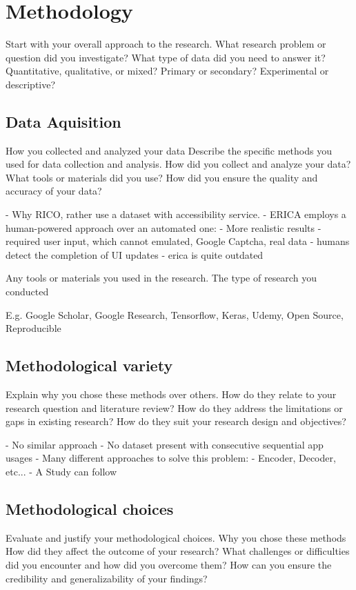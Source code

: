 \chapter{Methodology}

Start with your overall approach to the research.
What research problem or question did you investigate?
What type of data did you need to answer it?
Quantitative, qualitative, or mixed? Primary or secondary? Experimental or descriptive?

\section{Data Aquisition}
How you collected and analyzed your data
Describe the specific methods you used for data collection and analysis.
How did you collect and analyze your data?
What tools or materials did you use?
How did you ensure the quality and accuracy of your data?

- Why RICO, rather use a dataset with accessibility service.
- ERICA employs a human-powered approach over an automated one:
    - More realistic results
    - required user input, which cannot emulated, Google Captcha, real data
    - humans detect the completion of UI updates \cite{deka2016erica}
    - erica is quite outdated


Any tools or materials you used in the research.
The type of research you conducted

E.g. Google Scholar, Google Research, Tensorflow, Keras, Udemy, Open Source, Reproducible

\section{Methodological variety}
Explain why you chose these methods over others.
How do they relate to your research question and literature review?
How do they address the limitations or gaps in existing research?
How do they suit your research design and objectives?

- No similar approach
- No dataset present with consecutive sequential app usages
- Many different approaches to solve this problem:
    - Encoder, Decoder, etc...
- A Study can follow

\section{Methodological choices}
Evaluate and justify your methodological choices.
Why you chose these methods
How did they affect the outcome of your research?
What challenges or difficulties did you encounter and how did you overcome them?
How can you ensure the credibility and generalizability of your findings?


